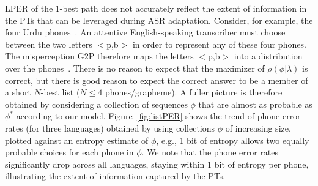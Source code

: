 
LPER of the 1-best path does not
accurately reflect the extent of information in the PTs that can be
leveraged during ASR adaptation.  Consider, for example, the four
Urdu phones~\ipa{[p,p\textsuperscript{h},b,\"*b]}.  An attentive
English-speaking transcriber must choose between the two letters
$<$p,b$>$ in order to represent any of these four phones.  The
misperception G2P therefore maps the letters $<$p,b$>$ into a
distribution over the phones~\ipa{[p,p\textsuperscript{h},b,\"*b]}.
There is no reason to expect that the maximizer of
$\rho(\phi|\lambda)$ is correct, but there is good reason to expect
the correct answer to be a member of a short $N$-best list ($N\le 4$
phones/grapheme).  A fuller picture is therefore obtained by
considering a collection of sequences $\phi$ that are almost as
probable as $\phi^*$ according to our model. Figure~\ref{fig:listPER}
shows the trend of phone error rates (for three languages) obtained by
using collections $\phi$ of increasing size, plotted against an
entropy estimate of $\phi$, e.g., 1 bit of entropy allows two equally
probable choices for each phone in $\phi$. We note that the phone
error rates significantly drop across all languages, staying within 1
bit of entropy per phone, illustrating the extent of information
captured by the PTs.

